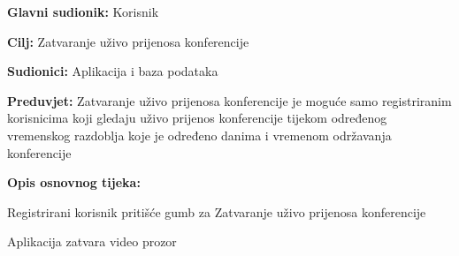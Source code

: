 				
				
				\noindent {}
				\begin{packed_item}
					
					\item \textbf{Glavni sudionik: }Korisnik
					\item  \textbf{Cilj:} Zatvaranje uživo prijenosa konferencije
					\item  \textbf{Sudionici:} Aplikacija i baza podataka
					\item  \textbf{Preduvjet:} Zatvaranje uživo prijenosa konferencije je moguće samo registriranim korisnicima koji gledaju uživo prijenos konferencije tijekom određenog vremenskog razdoblja koje je određeno danima i vremenom održavanja konferencije
					\item  \textbf{Opis osnovnog tijeka:}
					
					\item[] \begin{packed_enum}
						
						\item Registrirani korisnik pritišće gumb za Zatvaranje uživo prijenosa konferencije 
						\item Aplikacija zatvara video prozor
						
						
					\end{packed_enum}
					
				\end{packed_item}
				
